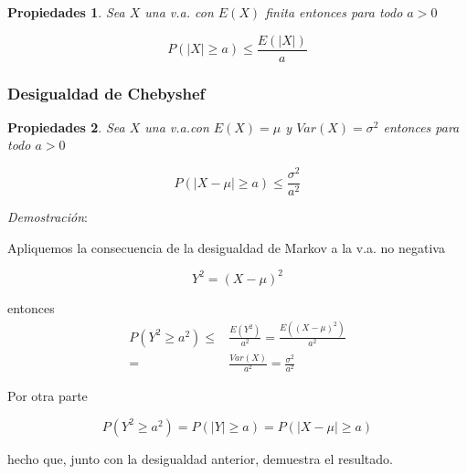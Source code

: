 \documentclass[handout]{beamer}\usepackage[]{graphicx}\usepackage[]{color}
\renewcommand{\leq}{\leqslant}
\renewcommand{\geq}{\geqslant}
\theoremstyle{plain}
\newtheorem{prop}{Propiedades}
\theoremstyle{definition}
\begin{document}
\begin{frame}

\begin{prop}
Sea $X$ una v.a. con $E(X)$ finita entonces  para todo $a>0$

$$P(|X|\geq a )\leq
\frac{E(|X|)}{a}$$
\end{prop}

\end{frame}
\subsubsection{Desigualdad de Chebyshef}
\begin{frame}


\begin{prop}
Sea  $X$ una v.a.con $E(X)=\mu$ y $Var(X)=\sigma^2$ 
entonces para todo $a>0$

$$P(|X-\mu|\geq a)\leq \frac{\sigma^{2}}{a^2}$$ 
\end{prop}

\end{frame}

\begin{frame}

\textit{Demostración}:

Apliquemos la consecuencia de la desigualdad de Markov a la v.a.
no negativa 

$$Y^2=(X-\mu)^{2}$$

entonces
\begin{equation*}
\begin{split}
P(Y^2\geq a^2)\leq & 
\frac{E(Y^2)}{a^2}=\frac{E((X-\mu)^{2})}{a^2}\\
= & \frac{Var(X)}{a^2}=\frac{\sigma^{2}}{a^{2}}
\end{split}
\end{equation*}

\end{frame}

\begin{frame}

Por otra parte

$$P(Y^2\geq a^2)=P(|Y|\geq a)= P(|X-\mu|\geq a)$$

hecho que, junto con la desigualdad anterior,
demuestra el resultado.

\end{frame}

\end{document}
